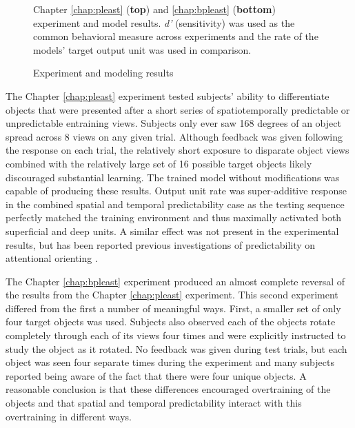 \documentclass[dwyatte_dissertation.tex]{subfiles}
\begin{document}
\begin{figure}[h!]
\begin{center}
\begin{tabular}{ll}
\end{tabular}
\end{center}
\caption{Experiment and modeling results}{Chapter \ref{chap:pleast} (\textbf{top}) and \ref{chap:bpleast} (\textbf{bottom}) experiment and model results. \textit{d'} (sensitivity) was used as the common behavioral measure across experiments and the rate of the models' target output unit was used in comparison.}
\label{fig:sims_test}
\end{figure}

The Chapter \ref{chap:pleast} experiment tested subjects' ability to differentiate objects that were presented after a short series of spatiotemporally predictable or unpredictable entraining views. Subjects only ever saw 168 degrees of an object spread across 8 views on any given trial. Although feedback was given following the response on each trial, the relatively short exposure to disparate object views combined with the relatively large set of 16 possible target objects likely discouraged substantial learning. The trained model without modifications was capable of producing these results. Output unit rate was super-additive response in the combined spatial and temporal predictability case as the testing sequence perfectly matched the training environment and thus maximally activated both superficial and deep units. A similar effect was not present in the experimental results, but has been reported previous investigations of predictability on attentional orienting \cite{DohertyRaoMesulamEtAl05,RohenkohlGouldPessoaEtAl14}.

The Chapter \ref{chap:bpleast} experiment produced an almost complete reversal of the results from the Chapter \ref{chap:pleast} experiment. This second experiment differed from the first a number of meaningful ways. First, a smaller set of only four target objects was used. Subjects also observed each of the objects rotate completely through each of its views four times and were explicitly instructed to study the object as it rotated. No feedback was given during test trials, but each object was seen four separate times during the experiment and many subjects reported being aware of the fact that there were four unique objects. A reasonable conclusion is that these differences encouraged overtraining 
of the objects and that spatial and temporal predictability interact with this overtraining in different ways.
\end{document}
